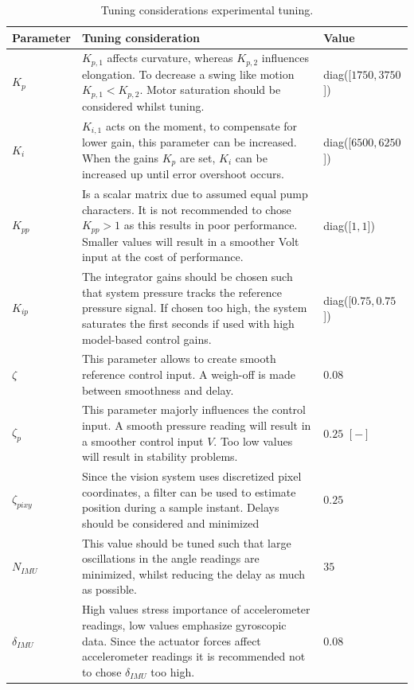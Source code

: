 \begin{table}[H]
    \centering
     \caption{Tuning considerations experimental tuning.}
\begin{tabular}{p{2.5cm} p{9cm} p{3cm}} \hline
      \textbf{Parameter}   & \textbf{Tuning  consideration} & \textbf{Value } \\ \hline
      $K_p$   &   $K_{p,1}$ affects curvature, whereas $K_{p,2}$ influences elongation. To decrease a swing like motion $K_{p,1} < K_{p,2}$. Motor saturation should be considered whilst tuning.   &  diag([$1750,3750$])            \\ \hline
      $K_i$   &   $K_{i,1}$ acts on the moment, to compensate for lower gain, this parameter can be increased. When the gains $K_p$ are set, $K_i$ can be increased up until error overshoot occurs.   &  diag([$6500,6250$])    \\ \hline
      $K_{pp}$   &  Is a scalar matrix due to assumed equal pump characters. It is not recommended to chose $K_{pp} >1$ as this results in poor performance. Smaller values will result in a smoother Volt input at the cost of performance.  &  diag([$1 ,1$])     \\ \hline
      $K_{ip}$   &  The integrator gains should be chosen such that system pressure tracks the reference pressure signal. If chosen too high, the system saturates the first seconds if used with high model-based control gains.    &  diag([$0.75,0.75$])    \\ \hline
      $\zeta$    &   This parameter allows to create smooth reference control input. A weigh-off is made between smoothness and delay. &  $0.08$  \\ \hline
      $\zeta_p$    &   This parameter majorly influences the control input. A smooth pressure reading will result in a smoother control input $V$. Too low values will result in stability problems.   & $0.25$ $[-]$  \\ \hline
      $\zeta_{pixy}$    &  Since the vision system uses discretized pixel coordinates, a filter can be used to estimate position during a sample instant. Delays should be considered and minimized     & $0.25$   \\ \hline
      $N_{IMU}$    &  This value should be tuned such that large oscillations in the angle readings are minimized, whilst reducing the delay as much as possible. & $35$   \\ \hline
      $\delta_{IMU}$    &  High values stress importance of accelerometer readings, low values emphasize gyroscopic data. Since the actuator forces affect accelerometer readings it is recommended not to chose $\delta_{IMU}$ too high.  & $0.08$  \\ \hline
    \end{tabular}
    \label{tab5:tuningcosiderations}
\end{table}



